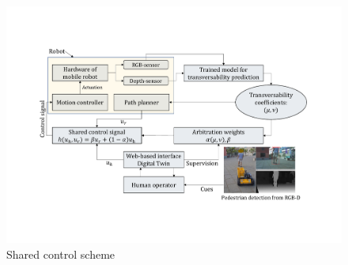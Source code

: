 \documentclass[letterpaper, 10 pt, conference]{ieeeconf}  %
\begin{document}
   \begin{figure}[hb]
	\centerline{\includegraphics[width=\columnwidth]{images/transversability2.pdf}}
	\caption{Shared control scheme}
	\label{fig:architecture}
\end{figure}
\end{document}
